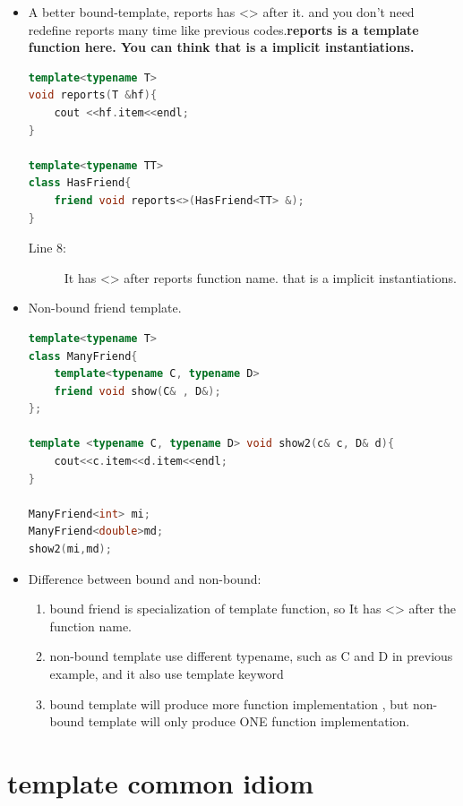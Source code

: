 \documentclass[a4paper,11pt,twoside]{book}
\begin{document}
\begin{itemize}
	\item A better bound-template, reports has <> after it.  and you don't need redefine reports many time like previous codes.\textbf{reports is a template function here. You can think that is a implicit instantiations. }
\begin{lstlisting}[frame=single, language=c++]
template<typename T>
void reports(T &hf){
	cout <<hf.item<<endl;
}

template<typename TT>
class HasFriend{
	friend void reports<>(HasFriend<TT> &);
}
\end{lstlisting}
\begin{description}
	\item[Line 8:] It has <> after reports function name. that is a implicit instantiations.
\end{description}

	\item Non-bound friend template.
\begin{lstlisting}[frame=single, language=c++]
template<typename T>
class ManyFriend{
	template<typename C, typename D>
	friend void show(C& , D&);
};
	
template <typename C, typename D> void show2(c& c, D& d){
	cout<<c.item<<d.item<<endl;
}
	
ManyFriend<int> mi;
ManyFriend<double>md;
show2(mi,md);
\end{lstlisting}
	
	\item Difference between bound and non-bound:
	
	\begin{enumerate}
		\item bound friend is specialization of template function, so It has <> after the function name.
		
		\item non-bound template use different typename, such as C and D in previous example, and it also use template keyword
		
		\item bound template will produce more function implementation , but non-bound template will only produce ONE function implementation.
	\end{enumerate}
\end{itemize}

\section{template common idiom}
\end{document}
